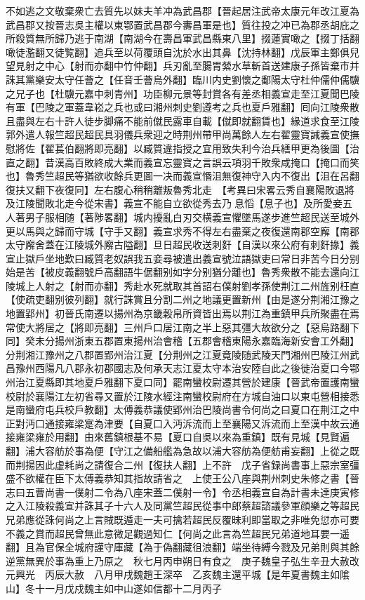 不如逃之文敬棄衆亡去質先以妹夫羊冲為武昌郡【晉起居注武帝太康元年改江夏為武昌郡又按晉志吳主權以東鄂置武昌郡今夀昌軍是也】質往投之冲已為郡丞胡庇之所殺質無所歸乃逃于南湖【南湖今在壽昌軍武昌縣東八里】掇蓮實噉之【掇丁括翻噉徒濫翻又徒覧翻】追兵至以荷覆頭自沈於水出其鼻【沈持林翻】戊辰軍主鄭俱兒望見射之中心【射而亦翻中竹仲翻】兵刃亂至腸胃縈水草斬首送建康子孫皆棄市并誅其黨樂安太守任薈之【任音壬薈烏外翻】臨川内史劉懷之鄱陽太守杜仲儒仲儒驥之兄子也【杜驥元嘉中刺青州】功臣柳元景等封賞各有差丞相義宣走至江夏聞巴陵有軍【巴陵之軍蓋韋崧之兵也或曰湘州刺史劉遵考之兵也夏戶雅翻】囘向江陵衆散且盡與左右十許人徒步脚痛不能前僦民露車自載【僦即就翻賃也】緣道求食至江陵郭外遣人報竺超民超民具羽儀兵衆迎之時荆州帶甲尚萬餘人左右翟靈寶誡義宣使撫慰將佐【翟萇伯翻將即亮翻】以臧質違指授之宜用致失利今治兵繕甲更為後圖【治直之翻】昔漢高百敗終成大業而義宣忘靈寶之言誤云項羽千敗衆咸掩口【掩口而笑也】魯秀竺超民等猶欲收餘兵更圖一决而義宣惽沮無復神守入内不復出【沮在呂翻復扶又翻下夜復冋】左右腹心稍稍離叛魯秀北走　【考異曰宋畧云秀自襄陽敗退將及江陵聞敗北走今從宋書】義宣不能自立欲從秀去乃息慆【息子也】及所愛妾五人著男子服相随【著陟畧翻】城内擾亂白刃交横義宣懼墜馬遂步進竺超民送至城外更以馬與之歸而守城【守手又翻】義宣求秀不得左右盡棄之夜復還南郡空廨【南郡太守廨舍蓋在江陵城外廨古隘翻】旦日超民收送刺姧【自漢以來公府有刺姧掾】義宣止獄戶坐地歎曰臧質老奴誤我五妾尋被遣出義宣號泣語獄吏曰常日非苦今日分别始是苦【被皮義翻號戶高翻語牛倨翻别如字分别猶分離也】魯秀衆散不能去還向江陵城上人射之【射而亦翻】秀赴水死就取其首詔右僕射劉孝孫使荆江二州旌别枉直【使疏吏翻别彼列翻】就行誅賞且分割二州之地議更置新州【由是遂分荆湘江豫之地置郢州】初晉氏南遷以揚州為京畿穀帛所資皆出焉以荆江為重鎮甲兵所聚盡在焉常使大將居之【將即亮翻】三州戶口居江南之半上惡其彊大故欲分之【惡烏路翻下同】癸未分揚州浙東五郡置東揚州治會稽【五郡會稽東陽永嘉臨海新安會工外翻】分荆湘江豫州之八郡置郢州治江夏【分荆州之江夏竟陵随武陵天門湘州巴陵江州武昌豫州西陽凡八郡永初郡國志及何承天志江夏太守本治安陸自此之後徙治夏口今鄂州治江夏縣即其地夏戶雅翻下夏口同】罷南蠻校尉遷其營於建康【晉武帝置護南蠻校尉於襄陽江左初省尋又置於江陵水經注南蠻校尉府在方城自油口以東屯營相接悉是南蠻府屯兵校戶教翻】太傅義恭議使郢州治巴陵尚書令何尚之曰夏口在荆江之中正對沔口通接雍梁寔為津要【自夏口入沔泝流而上至襄陽又泝流而上至漢中故云通接雍梁雍於用翻】由來舊鎮根基不易【夏口自吳以來為重鎮】既有見城【見賢遍翻】浦大容舫於事為便【守江之備船艦為急故以浦大容舫為便舫甫妄翻】上從之既而荆揚因此虚耗尚之請復合二州【復扶人翻】上不許　戊子省録尚書事上惡宗室彊盛不欲權在臣下太傅義恭知其指故請省之　上使王公八座與荆州刺史朱修之書【晉志曰五曹尚書一僕射二令為八座宋蓋二僕射一令】令丞相義宣自為計書未達庚寅修之入江陵殺義宣并誅其子十六人及同黨竺超民從事中郎蔡超諮議參軍顔樂之等超民兄弟應從誅何尚之上言賊既遁走一夫可擒若超民反覆昧利即當取之非唯免愆亦可要不義之賞而超民曾無此意微足觀過知仁【何尚之此言為竺超民兄弟道地耳要一遥翻】且為官保全城府謹守庫藏【為于偽翻藏徂浪翻】端坐待縛今戮及兄弟則與其餘逆黨無異於事為重上乃原之　秋七月丙申朔日有食之　庚子魏皇子弘生辛丑大赦改元興光　丙辰大赦　八月甲戌魏趙王深卒　乙亥魏主還平城【是年夏書魏主如隂山】冬十一月戊戍魏主如中山遂如信都十二月丙子

